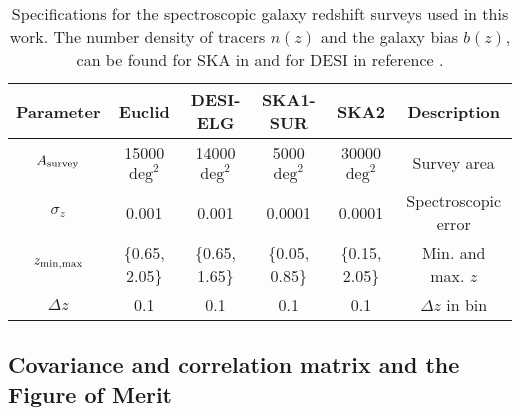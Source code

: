 \begin{table}[h]
	\centering{}
	\begin{tabular}{|c|cccc|c|}
		\hline 
		\Tstrut \textbf{Parameter}  & \textbf{Euclid}  & \textbf{DESI-ELG}  & \textbf{SKA1-SUR}
		& \textbf{SKA2}  & \textbf{Description}\tabularnewline
		\hline 
		\Tstrut $A_{\rm survey}$  & 15000 $\mbox{deg}^{2}$  & 14000 $\mbox{deg}^{2}$  & 5000
		$\mbox{deg}^{2}$  & 30000 $\mbox{deg}^{2}$  & Survey area\tabularnewline
		$\sigma_{z}$  & 0.001  & 0.001  & 0.0001  & 0.0001  & Spectroscopic
		error\tabularnewline
		$z_{\rm min,max}$  & \{0.65, 2.05\}  & \{0.65, 1.65\}  & \{0.05, 0.85\}
		& \{0.15, 2.05\}  & Min. and max. $z$ \tabularnewline
		$\Delta z$  & 0.1  & 0.1  & 0.1  & 0.1  & $\Delta z$ in bin\tabularnewline
		\hline 
	\end{tabular}\caption[Specifications for future GC surveys.]{\label{tab:GC-specifications} Specifications for
		the spectroscopic
		galaxy redshift surveys used in this work. The number density of tracers $n(z)$ and the galaxy bias $b(z)$, can be found for SKA in \cite{santos_hi_2015} and for DESI in reference \cite{desi_collaboration_desi_2016-1}.}
\end{table}






\subsection{Covariance and correlation matrix and the Figure of Merit\label{sec:covcorr}}

